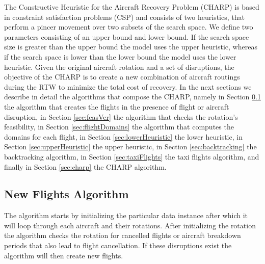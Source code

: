 

\newcommand\mycommfont[1]{\footnotesize\ttfamily\textcolor{blue}{#1}}



%
	
	The Constructive Heuristic for the Aircraft Recovery Problem (CHARP) is based in constraint satisfaction problems (CSP) and consists of two heuristics, that perform a pincer movement over two subsets of the search space. We define two parameters consisting of an upper bound and lower bound. If the search space size is greater than the upper bound the model uses the upper heuristic, whereas if the search space is lower than the lower bound the model uses the lower heuristic.
	 Given the original aircraft rotation and a set of disruptions, the objective of the CHARP is to create a new combination of aircraft routings during the RTW to minimize the total cost of recovery. 
	In the next sections we describe in detail the algorithms that compose the CHARP, namely in Section \ref{sec:newFlightsAlgo} the algorithm that creates the flights in the presence of flight or aircraft disruption, in Section \ref{sec:feasVer}  the algorithm that checks the rotation's feasibility, in Section \ref{sec:flightDomains} the algorithm that computes the domains for each flight, in Section \ref{sec:lowerHeuristic} the lower heuristic, in Section \ref{sec:upperHeuristic} the upper heuristic, in Section \ref{sec:backtracking}  the backtracking algorithm, in Section \ref{sec:taxiFlights} the taxi flights algorithm, and finally in Section \ref{sec:charp} the CHARP algorithm.


	\subsection{New Flights Algorithm} \label{sec:newFlightsAlgo}
	The algorithm starts by initializing the particular data instance after which it will loop through each aircraft and their rotations. After initializing the rotation the algorithm checks the rotation for cancelled flights or aircraft breakdown periods that also lead to flight cancellation. If these disruptions exist the algorithm will then create new flights.
	
